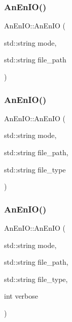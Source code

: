 \mbox{\label{class_an_en_i_o_ae6c32e309a740b6680e997728b3636a3}} 
\subsubsection{\texorpdfstring{An\+En\+I\+O()}{AnEnIO()}\hspace{0.1cm}{\footnotesize\ttfamily [3/6]}}
{\footnotesize\ttfamily An\+En\+I\+O\+::\+An\+En\+IO (\begin{DoxyParamCaption}\item[{std\+::string}]{mode,  }\item[{std\+::string}]{file\+\_\+path }\end{DoxyParamCaption})}

\mbox{\label{class_an_en_i_o_a7556c5e1e44c8d7eeec5dfc93467a91d}} 
\subsubsection{\texorpdfstring{An\+En\+I\+O()}{AnEnIO()}\hspace{0.1cm}{\footnotesize\ttfamily [4/6]}}
{\footnotesize\ttfamily An\+En\+I\+O\+::\+An\+En\+IO (\begin{DoxyParamCaption}\item[{std\+::string}]{mode,  }\item[{std\+::string}]{file\+\_\+path,  }\item[{std\+::string}]{file\+\_\+type }\end{DoxyParamCaption})}

\mbox{\label{class_an_en_i_o_a7c97d67357f729e50fc6e0d90fef9e36}} 
\subsubsection{\texorpdfstring{An\+En\+I\+O()}{AnEnIO()}\hspace{0.1cm}{\footnotesize\ttfamily [5/6]}}
{\footnotesize\ttfamily An\+En\+I\+O\+::\+An\+En\+IO (\begin{DoxyParamCaption}\item[{std\+::string}]{mode,  }\item[{std\+::string}]{file\+\_\+path,  }\item[{std\+::string}]{file\+\_\+type,  }\item[{int}]{verbose }\end{DoxyParamCaption})}

